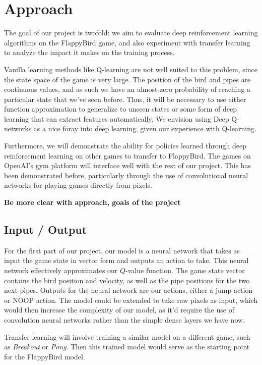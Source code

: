\documentclass{article}
\begin{document}
\section{Approach}

The goal of our project is twofold: we aim to evaluate deep reinforcement learning algorithms on the FlappyBird game, and also experiment with transfer learning to analyze the impact it makes on the training process. 

Vanilla learning methods like Q-learning are not well suited to this problem, since the state space of the game is very large. The position of the bird and pipes are continuous values, and as such we have an almost-zero probability of reaching a particular state that we've seen before.
Thus, it will be necessary to use either function approximation to generalize to unseen states or some form of deep learning that can extract features automatically.
We envision using Deep Q-networks as a nice foray into deep learning, given our experience with Q-learning.

Furthermore, we will demonstrate the ability for policies learned through deep reinforcement learning on  other games to transfer to FlappyBird.
The games on OpenAI's gym platform will interface well with the rest of our project. \cite{openaigym} \cite{ale}
This has been demonstrated before, particularly through the use of convolutional neural networks for playing games directly from pixels. \cite{deepmind}

\textbf{Be more clear with approach, goals of the project}

\subsection{Input / Output}

For the first part of our project, our model is a neural network that takes as input the game state in vector form and outputs an action to take. 
This neural network effectively approximates our $Q$-value function.
The game state vector contains the bird position and velocity, as well as the pipe positions for the two next pipes.
Outputs for the neural network are our actions, either a jump action or NOOP action.
The model could be extended to take raw pixels as input, which would then increase the complexity of our model, as it'd require the use of convolution neural networks rather than the simple dense layers we have now.

Transfer learning will involve training a similar model on a different game, such as \textit{Breakout} or \textit{Pong}.
Then this trained model would serve as the starting point for the FlappyBird model.
\end{document}
